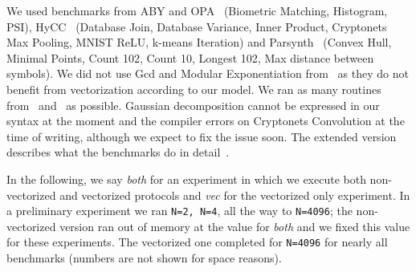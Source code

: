 We used benchmarks from ABY and OPA~\cite{NDSS:DemSchZoh15,Ishaq:2019} (Biometric Matching, Histogram, PSI), HyCC~\cite{CCS:BDKKS18} (Database Join, Database Variance, Inner Product, Cryptonets Max Pooling, MNIST ReLU, k-means Iteration) and Parsynth~\cite{Farzan:2021} (Convex Hull, Minimal Points, Count 102, Count 10, Longest 102, Max distance between symbols). 
We did not use Gcd and Modular Exponentiation from~\cite{Ishaq:2019} as they do not benefit from vectorization according to our model. 
We ran as many routines from~\cite{CCS:BDKKS18} and~\cite{Farzan:2021} as possible. Gaussian decomposition cannot be expressed 
in our syntax at the moment and the compiler errors on Cryptonets Convolution at the time of writing, although we expect to fix the issue soon. 
The extended version describes what the benchmarks do in detail~\cite{Anon_TR}.

In the following, we say {\em both} for an experiment in which we execute both non-vectorized and vectorized protocols and {\em vec} for the vectorized only experiment. 
In a preliminary experiment we ran {\tt N=2, N=4}, all the way to {\tt N=4096}; the non-vectorized version ran out of memory at the value for {\em both} and we fixed this value for these experiments. The vectorized one completed for {\tt N=4096} for nearly all benchmarks (numbers are not shown for space reasons).




